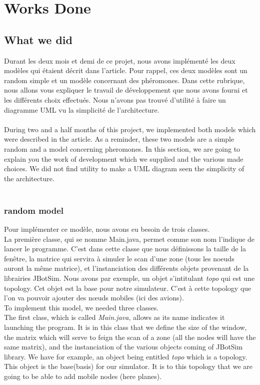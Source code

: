 \chapter{Works Done}
\section{What we did}
Durant les deux mois et demi de ce projet, nous avons implémenté les deux modèles qui étaient décrit dans l'article. Pour rappel, ces deux modèles sont un random simple et un modèle concernant des phéromones. Dans cette rubrique, nous allons vous expliquer le travail de développement que nous avons fourni et les différents choix effectués. Nous n'avons pas trouvé d'utilité à faire un diagramme UML vu la simplicité de l'architecture.\\\\

During two and a half months of this project, we implemented both models which were described in the article. As a reminder, these two models are a simple random and a model concerning pheromones. In this section, we are going to explain you the work of development which we supplied and the various made choices. We did not find utility to make a UML diagram seen the simplicity of the architecture.\\\\

\subsection{random model} 

Pour implémenter ce modèle, nous avons eu besoin de trois classes.\\
La première classe, qui se nomme Main.java, permet comme son nom l'indique de lancer le programme. C'est dans cette classe que nous définissons la taille de la fenêtre, la matrice qui servira à simuler le scan d'une zone (tous les noeuds auront la même matrice), et l'instanciation des différents objets provenant de la librairies JBotSim. Nous avons par exemple, un objet s'intitulant \textit{topo} qui est une topology. Cet objet est la base pour notre simulateur. C'est à cette topology que l'on va pouvoir ajouter des nœuds mobiles (ici des avions).\\

To implement this model, we needed three classes. \\
The first class, which is called \textit{Main.java}, allows as its name indicates it launching the program. It is in this class that we define the size of the window, the matrix which will serve to feign the scan of a zone (all the nodes will have the same matrix), and the instanciation of the various objects coming of JBotSim library. We have for example, an object being entitled \textit{topo} which is a topology. This object is the base(basis) for our simulator. It is to this topology that we are going to be able to add mobile nodes (here planes). \\

